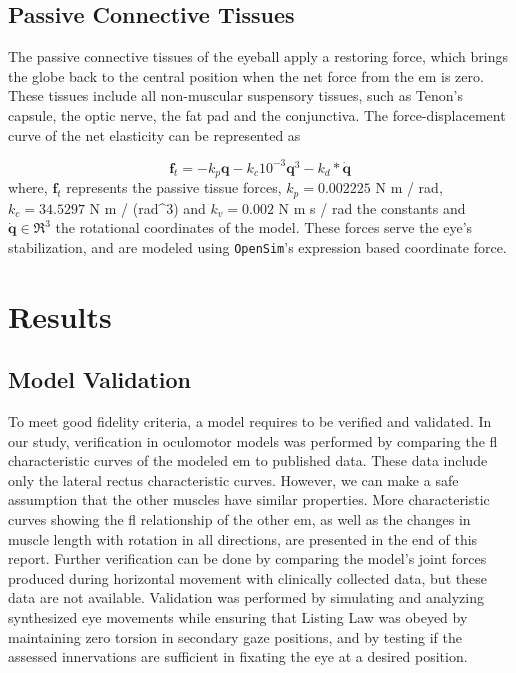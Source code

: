 \documentclass[11pt,a4paper,draft=false]{report}
\renewcommand*{\vec}[1]{\bm{#1}}
\newcommand{\R}[1]{\mathfrak{R}^{#1}}
\newcommand{\inr}[1]{\in\R{#1}}
\begin{document}
\subsection*{Passive Connective Tissues}\label{sec:passive-connective-tissues}

The passive connective tissues of the eyeball apply a restoring force, which
brings the globe back to the central position when the net force from the
\gls{em} is zero. These tissues include all non-muscular suspensory tissues,
such as Tenon’s capsule, the optic nerve, the fat pad and the conjunctiva. The
force-displacement curve of the net elasticity can be represented as

\begin{equation}\label{equ:passive-tissue}
  \vec{f}_t = -k_p \vec{q} - k_c 10^{-3} \vec{q}^3 - k_d * \vec{\dot{q}}
\end{equation}
% 
where, $\vec{f}_t$ represents the passive tissue forces, $k_p= 0.002225$ N m /
rad, $k_c= 34.5297$ N m / (rad^3) and $k_v= 0.002$ N m s / rad the constants and
$\vec{\dot{q}} \inr{3}$ the rotational coordinates of the model. These forces
serve the eye’s stabilization, and are modeled using \texttt{OpenSim}'s
expression based coordinate force.

\section*{Results}\label{sec:results}

\subsection*{Model Validation}\label{sec:model-validation}

To meet good fidelity criteria, a model requires to be verified and
validated. In our study, verification in oculomotor models was performed by
comparing the \gls{fl} characteristic curves of the modeled \gls{em} to
published data. These data include only the lateral rectus characteristic
curves. However, we can make a safe assumption that the other muscles have
similar properties. More characteristic curves showing the \gls{fl} relationship
of the other \gls{em}, as well as the changes in muscle length with rotation in
all directions, are presented in the end of this report. Further verification
can be done by comparing the model’s joint forces produced during horizontal
movement with clinically collected data, but these data are not available.
Validation was performed by simulating and analyzing synthesized eye movements
while ensuring that Listing Law was obeyed by maintaining zero torsion in
secondary gaze positions, and by testing if the assessed innervations are
sufficient in fixating the eye at a desired position.
\end{document}
